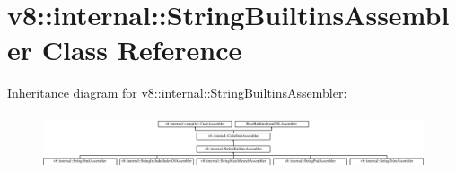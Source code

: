 \hypertarget{classv8_1_1internal_1_1StringBuiltinsAssembler}{}\section{v8\+:\+:internal\+:\+:String\+Builtins\+Assembler Class Reference}
\label{classv8_1_1internal_1_1StringBuiltinsAssembler}
Inheritance diagram for v8\+:\+:internal\+:\+:String\+Builtins\+Assembler\+:\begin{figure}[H]
\begin{center}
\leavevmode
\includegraphics[height=1.653136cm]{classv8_1_1internal_1_1StringBuiltinsAssembler}
\end{center}
\end{figure}
